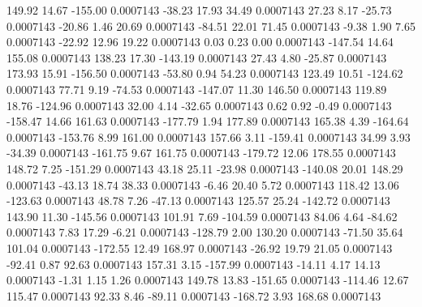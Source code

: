       149.92       14.67     -155.00     0.0007143
      -38.23       17.93       34.49     0.0007143
       27.23        8.17      -25.73     0.0007143
      -20.86        1.46       20.69     0.0007143
      -84.51       22.01       71.45     0.0007143
       -9.38        1.90        7.65     0.0007143
      -22.92       12.96       19.22     0.0007143
        0.03        0.23        0.00     0.0007143
     -147.54       14.64      155.08     0.0007143
      138.23       17.30     -143.19     0.0007143
       27.43        4.80      -25.87     0.0007143
      173.93       15.91     -156.50     0.0007143
      -53.80        0.94       54.23     0.0007143
      123.49       10.51     -124.62     0.0007143
       77.71        9.19      -74.53     0.0007143
     -147.07       11.30      146.50     0.0007143
      119.89       18.76     -124.96     0.0007143
       32.00        4.14      -32.65     0.0007143
        0.62        0.92       -0.49     0.0007143
     -158.47       14.66      161.63     0.0007143
     -177.79        1.94      177.89     0.0007143
      165.38        4.39     -164.64     0.0007143
     -153.76        8.99      161.00     0.0007143
      157.66        3.11     -159.41     0.0007143
       34.99        3.93      -34.39     0.0007143
     -161.75        9.67      161.75     0.0007143
     -179.72       12.06      178.55     0.0007143
      148.72        7.25     -151.29     0.0007143
       43.18       25.11      -23.98     0.0007143
     -140.08       20.01      148.29     0.0007143
      -43.13       18.74       38.33     0.0007143
       -6.46       20.40        5.72     0.0007143
      118.42       13.06     -123.63     0.0007143
       48.78        7.26      -47.13     0.0007143
      125.57       25.24     -142.72     0.0007143
      143.90       11.30     -145.56     0.0007143
      101.91        7.69     -104.59     0.0007143
       84.06        4.64      -84.62     0.0007143
        7.83       17.29       -6.21     0.0007143
     -128.79        2.00      130.20     0.0007143
      -71.50       35.64      101.04     0.0007143
     -172.55       12.49      168.97     0.0007143
      -26.92       19.79       21.05     0.0007143
      -92.41        0.87       92.63     0.0007143
      157.31        3.15     -157.99     0.0007143
      -14.11        4.17       14.13     0.0007143
       -1.31        1.15        1.26     0.0007143
      149.78       13.83     -151.65     0.0007143
     -114.46       12.67      115.47     0.0007143
       92.33        8.46      -89.11     0.0007143
     -168.72        3.93      168.68     0.0007143
